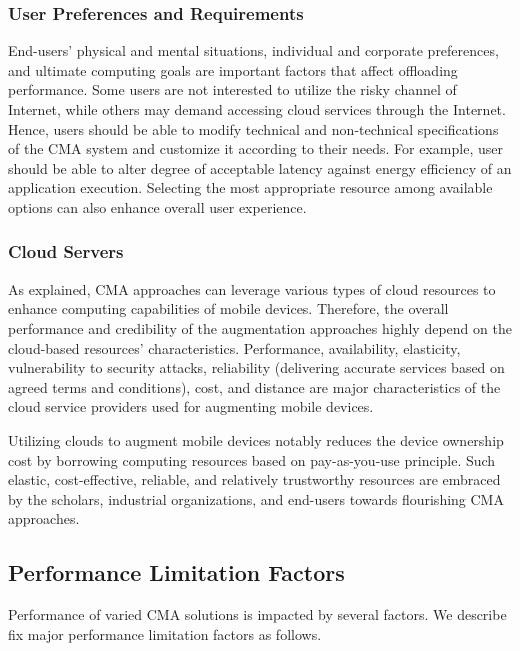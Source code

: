\documentclass[publish]{IEEEtran}
\begin{document}
\subsubsection{User Preferences and Requirements}
End-users' physical and mental situations, individual and corporate preferences, and ultimate computing goals are important factors that affect offloading performance. Some users are not interested to utilize the risky channel of Internet, while others may demand accessing cloud services through the Internet. Hence, users should be able to modify technical and non-technical specifications of the CMA system and customize it according to their needs. For example, user should be able to alter degree of acceptable latency against energy efficiency of an application execution. Selecting the most appropriate resource among available options can also enhance overall user experience. 

\subsubsection{Cloud Servers} \label{servers}
As explained, CMA approaches can leverage various types of cloud resources to enhance computing capabilities of mobile devices. Therefore, the overall performance and credibility of the augmentation approaches highly depend on the cloud-based resources' characteristics. Performance, availability, elasticity, vulnerability to security attacks, reliability (delivering accurate services based on agreed terms and conditions), cost, and distance are major characteristics of the cloud service providers used for augmenting mobile devices. 

Utilizing clouds to augment mobile devices notably reduces the device ownership cost by borrowing computing resources based on pay-as-you-use principle. Such elastic, cost-effective, reliable, and relatively trustworthy resources are embraced by the scholars, industrial organizations, and end-users towards flourishing CMA approaches. 

\subsection{Performance Limitation Factors}
Performance of varied CMA solutions is impacted by several factors. We describe fix major performance limitation factors as follows.
\end{document}
